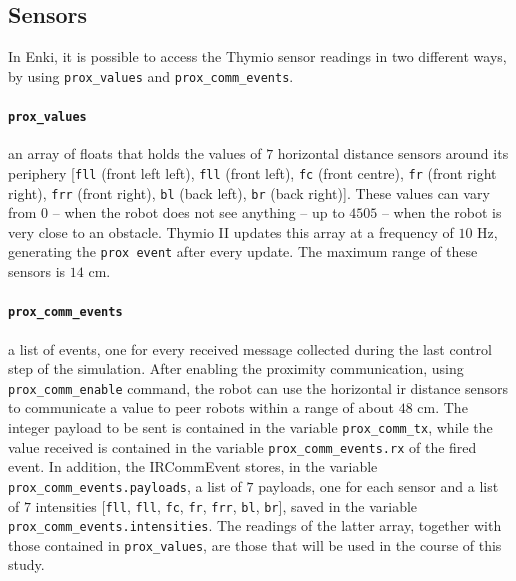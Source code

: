 \subsection{Sensors}
\label{subsec:enkisensors}
In Enki, it is possible to access the Thymio sensor readings in two different ways, 
by using \texttt{prox\_values} and \texttt{prox\_comm\_events}.

\paragraph{\texttt{prox\_values}}
 an array of floats that holds the values of $7$ horizontal distance sensors around 
 its periphery [\texttt{fll} (front left left), \texttt{fll} (front left), \texttt{fc} (front 
 centre), \texttt{fr} (front right right), \texttt{frr} (front right), \texttt{bl} (back left), 
 \texttt{br} (back right)]. 
These values can vary from $0$ – when the robot does not see anything – up to 
$4505$ – when the robot is very close to an obstacle. 
Thymio II updates this array at a frequency of $10$ \gls{Hz}, generating the 
\texttt{prox event} after every update. 
The maximum range of these sensors is $14$ \gls{cm}.

\paragraph{\texttt{prox\_comm\_events}}

a list of events, one for every received message collected during the last control 
step of the simulation. 
After enabling the proximity communication, using \texttt{prox\_comm\_enable} 
command, the robot can use the horizontal \gls{ir} distance sensors to 
communicate a value to peer robots within a range of about $48$ \gls{cm}. 
The integer payload to be sent is contained in the variable 
\texttt{prox\_comm\_tx}, while the value received is contained in the variable 
\texttt{prox\_comm\_events.rx} of the fired event.
In addition, the IRCommEvent stores, in the variable 
\texttt{prox\_comm\_events.payloads}, a list of $7$ payloads, one for each sensor 
and a list of  $7$ intensities  [\texttt{fll}, \texttt{fll}, \texttt{fc}, \texttt{fr}, 
\texttt{frr}, \texttt{bl}, \texttt{br}], saved in the variable 
\texttt{prox\_comm\_events.intensities}.
The readings of the latter array, together with those contained in 
\texttt{prox\_values}, are those that will be used in the course of this study.

